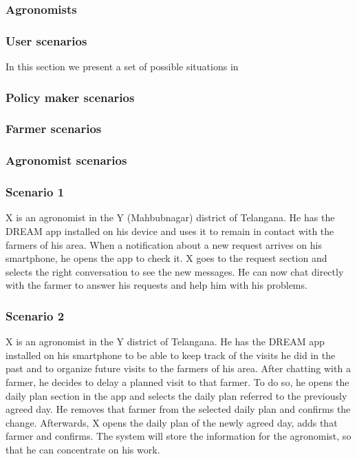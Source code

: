 \subsubsection{Agronomists}
\label{sect:agronomist_requirements}


\subsubsection{User scenarios}
In this section we present a set of possible situations in 
\subsubsection{Policy maker scenarios}
\subsubsection{Farmer scenarios}

\subsubsection{Agronomist scenarios}
\subsubsection*{Scenario 1}
X is an agronomist in the Y (Mahbubnagar) district of Telangana. He has the DREAM app installed on his device and uses it to remain in contact with the farmers of his area. When a notification about a new request arrives on his smartphone, he opens the app to check it. X goes to the request section and selects the right conversation to see the new messages. He can now chat directly with the farmer to answer his requests and help him with his problems.

\subsubsection*{Scenario 2}
X is an agronomist in the Y district of Telangana. He has the DREAM app installed on his smartphone to be able to keep track of the visits he did in the past and to organize future visits to the farmers of his area. After chatting with a farmer, he decides to delay a planned visit to that farmer. To do so, he opens the daily plan section in the app and selects the daily plan referred to the previously agreed day. He removes that farmer from the selected daily plan and confirms the change. Afterwards, X opens the daily plan of the newly agreed day, adds that farmer and confirms. The system will store the information for the agronomist, so that he can concentrate on his work.



